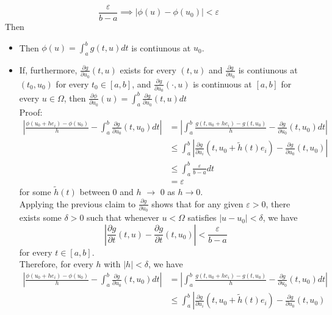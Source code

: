 \documentclass[../main.tex]{subfiles}
\begin{document}
\begin{enumerate}
\begin{equation}
\frac{\varepsilon}{b-a} \implies \left|\phi(u) - \phi(u_0) \right| < \varepsilon
\end{equation}
Then
\begin{itemize}
  \item Then  $\phi(u) = \int_a^b g(t,u)dt$ is contiunous at $u_0$.
  \item If, furthermore, $\frac{\partial g}{\partial u_0}(t,u)$ exists for every $(t,u)$ and 
  $\frac{\partial g}{\partial u_0}$ is contiunous at $(t_0,u_0)$ for every $t_0 \in [a,b]$,
  and $\frac{\partial g}{\partial u_0}(\cdot, u)$ is continuous at $[a,b]$ for every $u\in \Omega$,
  then $\frac{\partial \phi}{\partial u_0}(u) = \int_a^b \frac{\partial g}{\partial u_0}(t,u)dt$\\
  Proof:
  \begin{align}
  \left| \frac{\phi(u_0+h e_i) - \phi (u_0)}{h} - \int_a^b \frac{\partial g}{\partial u_0}(t,u_0)dt \right|
   &= \left|
    \int_a^b \frac{g(t,u_0 + h e_i) - g(t,u_0)}{h} - \frac{\partial g}{\partial u_0}(t,u_0)dt \right| \nonumber\\
    &\leq \int_a^b \left|
    \frac{\partial g}{\partial u_i}(t,u_0+\tilde{h}(t)e_i) - \frac{\partial g}{\partial u_0}(t,u_0)
    \right| \nonumber\\
    &\leq \int_a^b \frac{\varepsilon}{b-a} dt \nonumber\\
    &= \varepsilon
  \end{align}
  for some $\tilde{h}(t)$ between $0$ and $h$ $\to$ 0 as $h \to 0$.\\
  Applying the previous claim to $\frac{\partial g}{\partial u_0}$ shows that for any given $\varepsilon > 0$,
  there exists some $\delta > 0$ such that whenever $u< \Omega$ satisfies $\left| u - u_0 \right| < \delta$,
   we have 
   \begin{equation}
   \left| \frac{\partial g}{\partial t}(t,u) - \frac{\partial g}{\partial t}(t,u_0) \right| < \frac{\varepsilon}{b-a}
   \end{equation}
   for every $t \in [a,b]$.\\
   Therefore, for every $h$ with $\left| h \right| < \delta$, we have
   \begin{align}
  \left| \frac{\phi(u_0+h e_i) - \phi (u_0)}{h} - \int_a^b \frac{\partial g}{\partial u_0}(t,u_0)dt \right|
   &= \left|
    \int_a^b \frac{g(t,u_0 + h e_i) - g(t,u_0)}{h} - \frac{\partial g}{\partial u_0}(t,u_0)dt \right| \nonumber\\
    &\leq \int_a^b \left|
    \frac{\partial g}{\partial u_i}(t,u_0+\tilde{h}(t)e_i) - \frac{\partial g}{\partial u_0}(t,u_0)

\end{align}
\end{itemize}
\end{enumerate}
\end{document}
